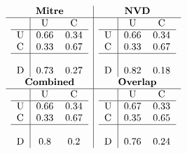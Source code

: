 \documentclass[11pt]{article}
\begin{document}
\begin{table}
	\centering
	\caption{Confusion matrices scope}
	\label{table:mitre-scope}
	\[
		\begin{array}{c|c}
			\textbf{Mitre}    & \textbf{NVD}     \\
			\hline
			\begin{tabular}{l|cc}
				  & U    & C    \\
				\hline
				U & 0.66 & 0.34 \\
				C & 0.33 & 0.67 \\
				\hline          \\
				D & 0.73 & 0.27 \\
			\end{tabular}
			                  &
			\begin{tabular}{l|cc}
				  & U    & C    \\
				\hline
				U & 0.66 & 0.34 \\
				C & 0.33 & 0.67 \\
				\hline          \\
				D & 0.82 & 0.18 \\
			\end{tabular}
			\\
			\textbf{Combined} & \textbf{Overlap} \\
			\hline
			\begin{tabular}{l|cc}
				  & U    & C    \\
				\hline
				U & 0.66 & 0.34 \\
				C & 0.33 & 0.67 \\
				\hline          \\
				D & 0.8  & 0.2  \\
			\end{tabular}
			                  &
			\begin{tabular}{l|cc}
				  & U    & C    \\
				\hline
				U & 0.67 & 0.33 \\
				C & 0.35 & 0.65 \\
				\hline          \\
				D & 0.76 & 0.24 \\
			\end{tabular}
		\end{array}
	\]
\end{table}
\end{document}
